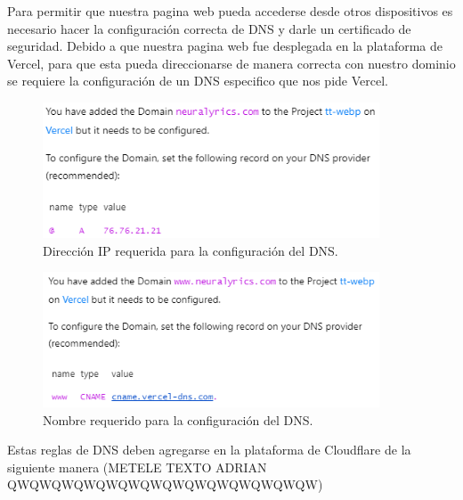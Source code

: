 \documentclass[12pt, a4paper, titlepage]{article}
\begin{document}
	Para permitir que nuestra pagina web pueda accederse desde otros dispositivos es necesario hacer la configuración correcta de DNS y darle un certificado de seguridad. Debido a que nuestra pagina web fue desplegada en la plataforma de Vercel, para que esta pueda direccionarse de manera correcta con nuestro dominio se requiere la configuración de un DNS especifico que nos pide Vercel.
	\begin{figure}[H] 
		\includegraphics[width=10cm]{./Imagenes/DnsSSL/Dns1.png}
		\centering \caption{Dirección IP requerida para la configuración del DNS.}
	\end{figure}
	\begin{figure}[H] 
		\includegraphics[width=10cm]{./Imagenes/DnsSSL/Dns2.png}
		\centering \caption{Nombre requerido para la configuración del DNS.}
	\end{figure}
	
	Estas reglas de DNS deben agregarse en la plataforma de Cloudflare de la siguiente manera (METELE TEXTO ADRIAN QWQWQWQWQWQWQWQWQWQWQWQWQWQW)
	
\end{document}
